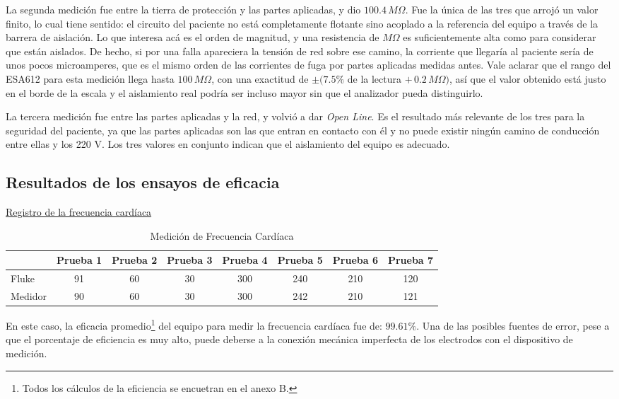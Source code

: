 La segunda medición fue entre la tierra de protección y las partes aplicadas, y dio $100.4 \,M\Omega$. Fue la única de las tres que arrojó un valor finito, lo cual tiene sentido: el circuito del paciente no está completamente flotante sino acoplado a la referencia del equipo a través
    de la barrera de aislación. Lo que interesa acá es el orden de magnitud, y una resistencia de $M\Omega$ es suficientemente alta como para considerar que están aislados. De hecho, si por una falla apareciera la tensión de red sobre ese camino, la corriente que llegaría al paciente
    sería de unos pocos microamperes, que es el mismo orden de las corrientes de fuga por partes aplicadas medidas antes. Vale aclarar que el rango del ESA612 para esta medición llega hasta $100 \,M\Omega$, con una exactitud de $\pm(7.5\%$ de la lectura $+ \,0.2 \,M\Omega)$, así que
    el valor obtenido está justo en el borde de la escala y el aislamiento real podría ser incluso mayor sin que el analizador pueda distinguirlo.

La tercera medición fue entre las partes aplicadas y la red, y volvió a dar \textit{Open Line}. Es el resultado más relevante de los tres para la seguridad del paciente, ya que las partes aplicadas son las que entran en contacto con él y no puede existir ningún camino de conducción
    entre ellas y los 220 V. Los tres valores en conjunto indican que el aislamiento del equipo es adecuado.

\subsection{Resultados de los ensayos de eficacia}

    \underline{Registro de la frecuencia cardíaca}

    \begin{table}[H]
    \centering
    \caption{Medición de Frecuencia Cardíaca}
    \begin{tabular}{lccccccc}
    \toprule
    & Prueba 1 & Prueba 2 & Prueba 3 & Prueba 4 & Prueba 5 & Prueba 6 & Prueba 7 \\
    \midrule
    Fluke   & 91 & 60 & 30 & 300 & 240 & 210 & 120 \\
    Medidor & 90 & 60 & 30 & 300 & 242 & 210 & 121 \\
    \bottomrule
    \end{tabular}
    \end{table}

    En este caso, la eficacia promedio\footnote{Todos los cálculos de la eficiencia se encuetran en el anexo B.} del equipo para medir la frecuencia cardíaca fue de: $99.61\%$. Una de las posibles fuentes de error, pese a que el porcentaje de eficiencia es muy alto, puede deberse a la
    conexión mecánica imperfecta de los electrodos con el dispositivo de medición.  


